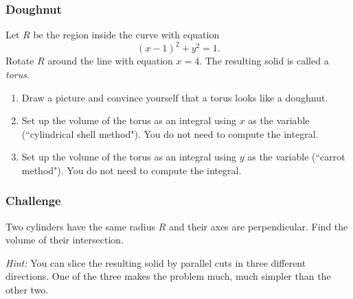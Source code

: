 \documentclass[14pt]{beamer}
\begin{document}
	\begin{frame}[t]
		\fontsize{13}{13}\selectfont
		\frametitle{Doughnut}

		Let $R$ be the region inside the curve with equation
		\[
			(x-1)^{2}+ y^{2}=1.
		\]
		Rotate $R$ around the line with equation $\displaystyle x=4$. The resulting
		solid is called a \emph{torus}.

		\begin{enumerate}
			\item Draw a picture and convince yourself that a torus looks like a doughnut.

			\item Set up the volume of the torus as an integral using $x$ as the variable
				(``cylindrical shell method"). You do not need to compute the integral.

			\item Set up the volume of the torus as an integral using $y$ as the variable
				(``carrot method"). You do not need to compute the integral.
		\end{enumerate}
	\end{frame}

	\begin{frame}[t]
		\frametitle{Challenge}

		Two cylinders have the same radius $R$ and their axes are perpendicular. Find
		the volume of their intersection.

		\emph{Hint:} You can slice the resulting solid by parallel cuts in three
		different directions. One of the three makes the problem much, much simpler
		than the other two.
	\end{frame}

\end{document}
